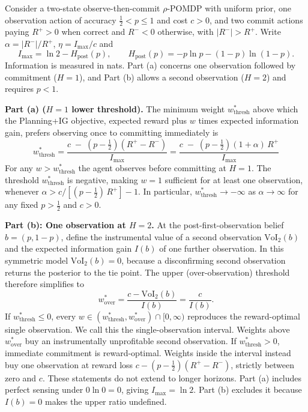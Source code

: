 \documentclass[runningheads]{llncs}
\begin{document}
\begin{proposition}
\label{prop:nearopt}
Consider a two-state observe-then-commit $\rho$-POMDP with uniform prior, one observation action of accuracy $\tfrac12<p\le1$ and cost $c>0$, and two commit actions paying $R^+>0$ when correct and $R^-<0$ otherwise, with $|R^-|>R^+$. Write $\alpha=|R^-|/R^+$, $\eta=I_{\max}/c$ and
\[
I_{\max}=\ln2-H_{\mathrm{post}}(p),\qquad
H_{\mathrm{post}}(p)=-p\ln p-(1-p)\ln(1-p).
\]
Information is measured in nats. Part (a) concerns one observation followed by commitment ($H=1$), and Part (b) allows a second observation ($H=2$) and requires $p<1$.

\textbf{Part (a) ($H{=}1$ lower threshold).} The minimum weight $w^*_{\mathrm{thresh}}$ above which the Planning+IG objective, expected reward plus $w$ times expected information gain, prefers observing once to committing immediately is
\begin{equation*}
    w^*_{\mathrm{thresh}} = \frac{c \;-\; \left(p - \tfrac{1}{2}\right)(R^+ - R^-)}{\,I_{\max}\,} = \frac{c \;-\; \left(p - \tfrac{1}{2}\right)(1 + \alpha)\,R^+}{\,I_{\max}\,}
\end{equation*}
For any $w > w^*_{\mathrm{thresh}}$ the agent observes before committing at $H{=}1$. The threshold $w^*_{\mathrm{thresh}}$ is negative, making $w{=}1$ sufficient for at least one observation, whenever $\alpha > c / [(p - \tfrac{1}{2})\,R^+] - 1$. In particular, $w^*_{\mathrm{thresh}} \to -\infty$ as $\alpha \to \infty$ for any fixed $p > \tfrac{1}{2}$ and $c > 0$.

\textbf{Part (b): One observation at $H{=}2$.} At the post-first-observation belief $b{=}(p, 1{-}p)$, define the instrumental value of a second observation $\mathrm{VoI}_2(b)$ and the expected information gain $I(b)$ of one further observation. In this symmetric model $\mathrm{VoI}_2(b)=0$, because a disconfirming second observation returns the posterior to the tie point. The upper (over-observation) threshold therefore simplifies to
\begin{equation*}
    w^*_{\mathrm{over}} = \frac{c-\mathrm{VoI}_2(b)}{I(b)} = \frac{c}{I(b)}.
\end{equation*} If $w^*_{\mathrm{thresh}}\le0$, every $w\in(w^*_{\mathrm{thresh}},w^*_{\mathrm{over}})\cap[0,\infty)$ reproduces the reward-optimal single observation. We call this the single-observation interval. Weights above $w^*_{\mathrm{over}}$ buy an instrumentally unprofitable second observation. If $w^*_{\mathrm{thresh}}>0$, immediate commitment is reward-optimal. Weights inside the interval instead buy one observation at reward loss $c-(p-\tfrac12)(R^+-R^-)$, strictly between zero and $c$. These statements do not extend to longer horizons. Part (a) includes perfect sensing under $0\ln0=0$, giving $I_{\max}=\ln2$. Part (b) excludes it because $I(b)=0$ makes the upper ratio undefined.
\end{proposition}
\end{document}
